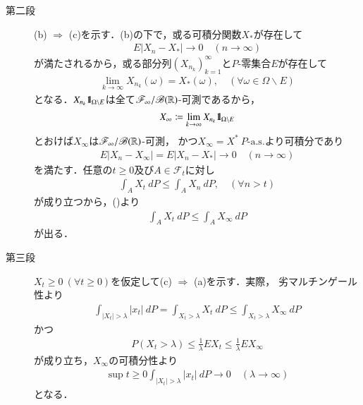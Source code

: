 \begin{prf}
\begin{description}
			\item[第二段]
				(b) $\Rightarrow$ (c)を示す．(b)の下で，或る可積分関数$X_*$が存在して
				\begin{align}
					E|X_n - X_*| \longrightarrow 0
					\quad (n \longrightarrow \infty)
				\end{align}
				が満たされるから，或る部分列$\left( X_{n_k} \right)_{k=1}^\infty$と$P$-零集合$E$が存在して
				\begin{align}
					\lim_{k \to \infty} X_{n_k}(\omega) = X_*(\omega),
					\quad (\forall \omega \in \Omega \backslash E)
				\end{align}
				となる．$X_{n_k}\mbox{1}\hspace{-0.25em}\mbox{l}_{\Omega \backslash E}$は全て$\mathscr{F}_\infty/\mathscr{B}(\mathbb{R})$-可測であるから，
				\begin{align}
					X_\infty \coloneqq \lim_{k \to \infty} X_{n_k} \mbox{1}\hspace{-0.25em}\mbox{l}_{\Omega \backslash E}
				\end{align}
				とおけば$X_\infty$は$\mathscr{F}_\infty/\mathscr{B}(\mathbb{R})$-可測，
				かつ$X_\infty = X^*\ \mbox{$P$-a.s.}$より可積分であり
				\begin{align}
					E|X_n - X_\infty| = E|X_n - X_*| \longrightarrow 0
					\quad (n \longrightarrow \infty)
					\label{eq:chapter_1_Problem_3_19_3}
				\end{align}
				を満たす．任意の$t \geq 0$及び$A \in \mathscr{F}_t$に対し
				\begin{align}
					\int_A X_t\ dP \leq \int_A X_n\ dP,
					\quad (\forall n > t)
					\label{eq:chapter_1_Problem_3_19_1}
				\end{align}
				が成り立つから，()より
				\begin{align}
					\int_A X_t\ dP \leq \int_A X_\infty\ dP
					\label{eq:chapter_1_Problem_3_19_2}
				\end{align}
				が出る．
				
			\item[第三段]
				$X_t \geq 0\ (\forall t \geq 0)$を仮定して(c) $\Rightarrow$ (a)を示す．実際，
				劣マルチンゲール性より
				\begin{align}
					\int_{|X_t| > \lambda} |x_t|\ dP
					= \int_{X_t > \lambda} X_t\ dP
					\leq \int_{X_t > \lambda} X_\infty\ dP
				\end{align}
				かつ
				\begin{align}
					P\left( X_t > \lambda \right)
					\leq \frac{1}{\lambda} EX_t
					\leq \frac{1}{\lambda} EX_\infty
				\end{align}
				が成り立ち，$X_\infty$の可積分性より
				\begin{align}
					\sup{t \geq 0}{\int_{|X_t| > \lambda} |x_t|\ dP} 
					\longrightarrow 0
					\quad (\lambda \longrightarrow \infty)
				\end{align}
				となる．
				\QED
		\end{description}
	\end{prf}
	
